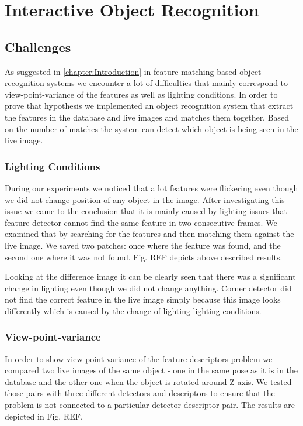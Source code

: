 \chapter{Interactive Object Recognition}
\label{chapter:Object Recognition}

\section{Challenges}
As suggested in \ref{chapter:Introduction} in feature-matching-based object recognition systems we encounter a lot of difficulties that mainly correspond to view-point-variance of the features as well as lighting conditions. In order to prove that hypothesis we implemented an object recognition system that extract the features in the database and live images and matches them together. Based on the number of matches the system can detect which object is being seen in the live image.

\subsection{Lighting Conditions}

During our experiments we noticed that a lot features were flickering even though we did not change position of any object in the image. After investigating this issue we came to the conclusion that it is mainly caused by lighting issues that feature detector cannot find the same feature in two consecutive frames. We examined that by searching for the features and then matching them against the live image. We saved two patches: once where the feature was found, and the second one where it was not found. Fig. REF depicts above described results.

Looking at the difference image it can be clearly seen that there was a significant change in lighting even though we did not change anything. Corner detector did not find the correct feature in the live image simply because this image looks differently which is caused by the change of lighting lighting conditions.

\subsection{View-point-variance}

In order to show view-point-variance of the feature descriptors problem we compared two live images of the same object - one in the same pose as it is in the database and the other one when the object is rotated around Z axis. We tested those pairs with three different detectors and descriptors to ensure that the problem is not connected to a particular detector-descriptor pair. The results are depicted in Fig. REF.

